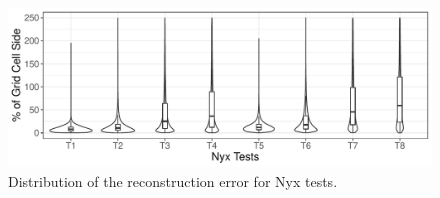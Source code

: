 \begin{figure}[!t]
\centering
\includegraphics[width=\linewidth]{Images/Nyx_Tests.pdf}
\caption{Distribution of the reconstruction error for Nyx tests.}
\label{fig:nyx_plot}
\end{figure}
